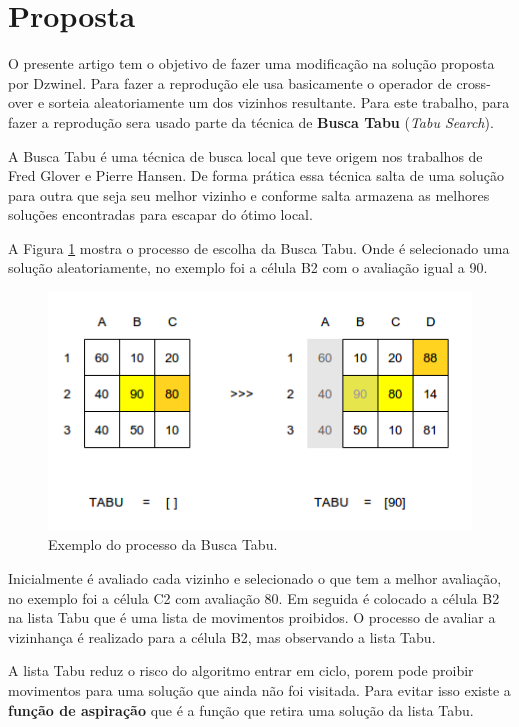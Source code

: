 \documentclass[12pt]{article}
\begin{document}
\section{Proposta}

O presente artigo tem o objetivo de fazer uma modificação na solução proposta
por Dzwinel. Para fazer a reprodução ele usa basicamente o operador de cross-
over e sorteia aleatoriamente um dos vizinhos resultante. Para este trabalho, 
para fazer a reprodução sera usado parte da técnica de \textbf{Busca Tabu}
(\textit{Tabu Search}).

A Busca Tabu é uma técnica de busca local que teve origem nos trabalhos de
Fred Glover e Pierre Hansen. De forma prática essa técnica salta de uma
solução para outra que seja seu melhor vizinho e conforme salta armazena as
melhores soluções encontradas para escapar do ótimo local.

A Figura \ref{fig:busca-tabu} mostra o processo de escolha da Busca Tabu.
Onde é selecionado uma solução aleatoriamente, no exemplo foi a célula B2 com
o avaliação igual a 90.

\begin{figure}[h!]
\centering
\includegraphics[width=.5\textwidth]{imagens/busca-tabu}
\caption{Exemplo do processo da Busca Tabu.}
\label{fig:busca-tabu}
\end{figure}

Inicialmente é avaliado cada vizinho e selecionado o que tem a melhor
avaliação, no exemplo foi a célula C2 com avaliação 80. Em seguida é colocado
a célula B2 na lista Tabu que é uma lista de movimentos proibidos. O processo
de avaliar a vizinhança é realizado para a célula B2, mas observando a lista
Tabu.

A lista Tabu reduz o risco do algoritmo entrar em ciclo, porem pode proibir
movimentos para uma solução que ainda não foi visitada. Para evitar isso
existe a \textbf{função de aspiração} que é a função que retira uma solução da
lista Tabu.
\end{document}
